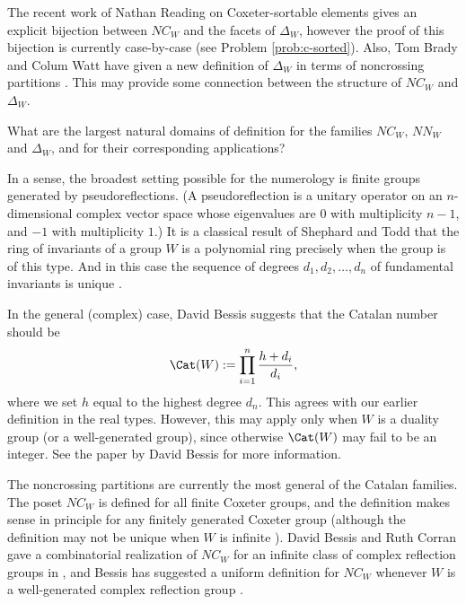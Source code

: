 \begin{problemblock}
\begin{remark}The recent work of Nathan Reading on Coxeter-sortable elements
\cite{reading} gives an explicit bijection between $NC_W$ and the
facets of $\Delta_W$, however the proof of this bijection is currently
case-by-case (see Problem \ref{prob:c-sorted}). Also, Tom Brady and Colum
Watt have given a new definition of $\Delta_W$ in terms of noncrossing
partitions \cite{brady-watt}. This may provide some connection between
the structure of $NC_W$ and $\Delta_W$.
\end{remark}

\end{problemblock}


\begin{problemblock}

\begin{problem}[1.3]\label{central:two} What are the largest natural domains of definition for the families $NC_W$, $NN_W$ and $\Delta_W$, and for their corresponding applications?\end{problem}

\begin{remark}
In a sense, the broadest setting possible for the numerology is  finite
groups generated by pseudoreflections. (A pseudoreflection is a unitary
operator on an $n$-dimensional complex vector space whose eigenvalues
are $0$ with multiplicity $n-1$, and $-1$ with multiplicity $1$.) It is
a classical result of Shephard and Todd that the ring of invariants of
a group $W$ is a polynomial ring precisely when the group is of this
type. And in this case the sequence of degrees $d_1,d_2,\ldots,d_n$
of fundamental invariants is unique \cite{shephard-todd}.

In the general (complex) case, David Bessis suggests that the Catalan number should be
\begin{equation*}
\Cat(W):= \prod_{i=1}^n  \frac{h+d_i}{d_i},
\end{equation*}
where we set $h$ equal to the highest degree $d_n$. This agrees with our earlier definition in the real types. However, this may apply only when $W$ is a duality group (or a well-generated group), since otherwise $\Cat(W)$ may fail to be an integer. See the paper \cite{bessis:complex} by David Bessis for more information.
\end{remark}

\begin{remark}
The noncrossing partitions are currently the most general of the Catalan families. The poset $NC_W$ is defined for all finite Coxeter groups, and the definition makes sense in principle for any finitely generated Coxeter group (although the definition may not be unique when $W$ is infinite \cite{mccammond-etal}). David Bessis and Ruth Corran gave a combinatorial realization of $NC_W$ for an infinite class of complex reflection groups in \cite{bessis-corran}, and Bessis has suggested a uniform definition for $NC_W$ whenever $W$ is a well-generated complex reflection group \cite{bessis:complex}.
\end{remark}


\end{problemblock}
